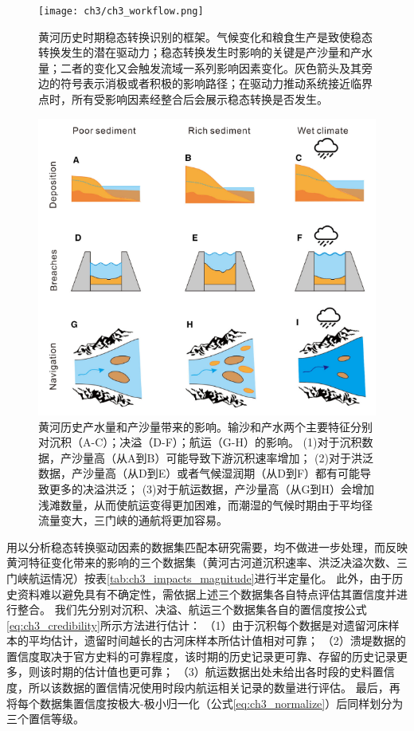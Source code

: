 \begin{figure}[htb] %
    \centering
    \texttt{[image: ch3/ch3\_workflow.png]}
    \caption[黄河历史时期稳态转换识别的框架]{黄河历史时期稳态转换识别的框架。气候变化和粮食生产是致使稳态转换发生的潜在驱动力；稳态转换发生时影响的关键是产沙量和产水量；二者的变化又会触发流域一系列影响因素变化。灰色箭头及其旁边的符号表示消极或者积极的影响路径；在驱动力推动系统接近临界点时，所有受影响因素经整合后会展示稳态转换是否发生。}
    \label{fig:ch3:regime_shift_detect}
\end{figure}

\begin{figure}[htb] %
    \centering
    \includegraphics[width=\textwidth]{img/ch3/ch3_impacts_diagram.png}
    \caption[黄河历史产水量和产沙量带来的影响]{黄河历史产水量和产沙量带来的影响。输沙和产水两个主要特征分别对沉积（A-C）；决溢（D-F）；航运（G-H）的影响。
    (1)对于沉积数据，产沙量高（从A到B）可能导致下游沉积速率增加\cite{xu2003a}；
    (2)对于洪泛数据，产沙量高（从D到E）或者气候湿润期（从D到F）都有可能导致更多的决溢洪泛\cite{chen2012}；
    (3)对于航运数据，产沙量高（从G到H）会增加浅滩数量，从而使航运变得更加困难，而潮湿的气候时期由于平均径流量变大，三门峡的通航将更加容易\cite{WangShouChun1993}。}
    \label{fig:ch3:impacts_diagram}
\end{figure}

用以分析稳态转换驱动因素的数据集匹配本研究需要，均不做进一步处理，而反映黄河特征变化带来的影响的三个数据集（黄河古河道沉积速率、洪泛决溢次数、三门峡航运情况）按表\ref{tab:ch3_impacts_magnitude}进行半定量化。
此外，由于历史资料难以避免具有不确定性，需依据上述三个数据集各自特点评估其置信度并进行整合。
我们先分别对沉积、决溢、航运三个数据集各自的置信度按公式\ref{eq:ch3_credibility}所示方法进行估计：
（1）由于沉积每个数据是对遗留河床样本的平均估计，遗留时间越长的古河床样本所估计值相对可靠；
（2）溃堤数据的置信度取决于官方史料的可靠程度，该时期的历史记录更可靠、存留的历史记录更多，则该时期的估计值也更可靠；
（3）航运数据出处未给出各时段的史料置信度，所以该数据的置信情况使用时段内航运相关记录的数量进行评估。
最后，再将每个数据集置信度按极大-极小归一化（公式\ref{eq:ch3_normalize}）后同样划分为三个置信等级。

